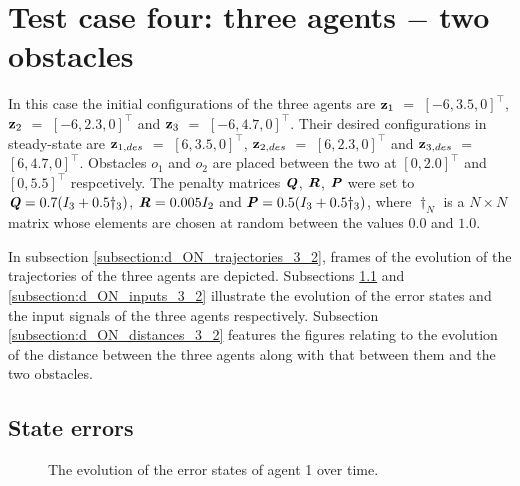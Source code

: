 \section{Test case four: three agents $-$ two obstacles}

In this case the initial configurations of the three agents are
$\bm{\mathbf{z}}_1$ $=$ $[-6, 3.5, 0]^{\top}$,
$\bm{\mathbf{z}}_2$ $=$ $[-6, 2.3, 0]^{\top}$ and
$\bm{\mathbf{z}}_3$ $=$ $[-6, 4.7, 0]^{\top}$.
Their desired configurations in steady-state are
$\bm{\mathbf{z}}_{1,des}$ $=$ $[6, 3.5, 0]^{\top}$,
$\bm{\mathbf{z}}_{2,des}$ $=$ $[6, 2.3, 0]^{\top}$ and
$\bm{\mathbf{z}}_{3,des}$ $=$ $[6, 4.7, 0]^{\top}$.
Obstacles $o_1$ and $o_2$ are placed between the two at $[0, 2.0]^{\top}$
and $[0, 5.5]^{\top}$ respcetively. The penalty
matrices $\bm{\mathit{Q}}$, $\bm{\mathit{R}}$, $\bm{\mathit{P}}$ were set to
$\bm{\mathit{Q}} = 0.7 (I_3 + 0.5\dagger_3)$, $\bm{\mathit{R}} = 0.005 I_2$ and
$\bm{\mathit{P}} = 0.5 (I_3 + 0.5\dagger_3)$, where $\dagger_N$ is a $N \times N$
matrix whose elements are chosen at random between the values $0.0$ and $1.0$.

In subsection \ref{subsection:d_ON_trajectories_3_2}, frames of the evolution of the
trajectories of the three agents are depicted. Subsections
\ref{subsection:d_ON_errors_3_2} and \ref{subsection:d_ON_inputs_3_2} illustrate
the evolution of the error states and the input signals of the three agents
respectively. Subsection \ref{subsection:d_ON_distances_3_2} features the
figures relating to the evolution of the distance between the three agents
along with that between them and the two obstacles.



\subsection{State errors}
\label{subsection:d_ON_errors_3_2}

\begin{figure}[H]\centering
  \scalebox{0.7}{}
  \caption{The evolution of the error states of agent 1 over time.}
  \label{fig:d_ON_3_2_errors_agent_1}
\end{figure}

